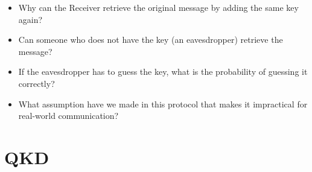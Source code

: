 \documentclass{beamer}
\begin{document}
\begin{frame}
    \begin{itemize}
        \item<+-> Why can the Receiver retrieve the original message by adding the same key again?
        \item<+-> Can someone who does not have the key (an eavesdropper) retrieve the message?
        \item<+-> If the eavesdropper has to guess the key, what is the probability of guessing it correctly?
        \item<+-> What assumption have we made in this protocol that makes it impractical for real-world communication?
    \end{itemize}
\end{frame}
\section{QKD}
\end{document}
